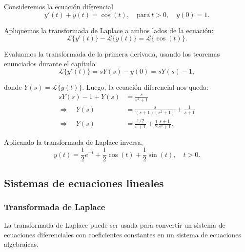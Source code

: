 \begin{ejemplo}
    Consideremos la ecuación diferencial
    $$y'(t) + y(t) = \cos(t), \quad \text{para} ~ t > 0, \quad y(0) = 1.$$

    Apliquemos la transformada de Laplace a ambos lados de la ecuación:
    $$\mathcal{L}\{y'(t)\} - \mathcal{L}\{y(t)\} = \mathcal{L}\{\cos(t)\}.$$

    Evaluamos la transformada de la primera derivada, usando los teoremas enunciados durante el capítulo.
    $$\mathcal{L}\{y'(t)\} = s Y(s) - y(0) = s Y(s) - 1,$$

    donde $Y(s) = \mathcal{L}\{y(t)\}$. Luego, la ecuación diferencial nos queda:
    \begin{align*}
        sY(s) - 1 + Y(s) &= \frac{s}{s^2+1} \\
        \Rightarrow \quad Y(s) &= \frac{s}{(s+1)(s^2+1)} + \frac{1}{s+1} \\
        \Rightarrow \quad Y(s) &= \frac{1/2}{s+1} + \frac{1}{2} \frac{s+1}{s^2+1}.
    \end{align*}

    Aplicando la transformada de Laplace inversa,
    $$y(t) = \frac{1}{2} e^{-t} + \frac{1}{2} \cos(t) + \frac{1}{2} \sin(t), \quad t > 0.$$
\end{ejemplo}


\subsection{Sistemas de ecuaciones lineales}

\subsubsection{Transformada de Laplace}

La transformada de Laplace puede ser usada para convertir un sistema de ecuaciones diferenciales con coeficientes constantes en un sistema de ecuaciones algebraicas. 

